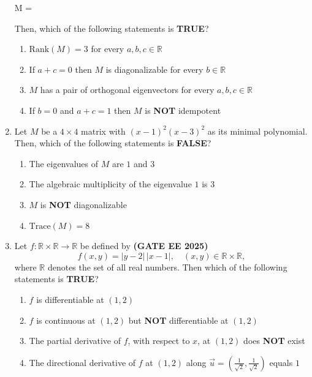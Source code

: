 \documentclass[journal,12pt,onecolumn]{IEEEtran}
\theoremstyle{remark}
\begin{document}
\begin{enumerate}
M = 


Then, which of the following statements is \textbf{TRUE}?
\begin{enumerate}
\item $\text{Rank}(M) = 3$ for every $a,b,c \in \mathbb{R}$
\item If $a+c=0$ then $M$ is diagonalizable for every $b \in \mathbb{R}$
\item $M$ has a pair of orthogonal eigenvectors for every $a,b,c \in \mathbb{R}$
\item If $b=0$ and $a+c=1$ then $M$ is \textbf{NOT} idempotent
\end{enumerate}


\item Let $M$ be a $4 \times 4$ matrix with $(x-1)^2(x-3)^2$ as its minimal polynomial. Then, which of the following statements is \textbf{FALSE}?
\begin{enumerate}
\item The eigenvalues of $M$ are $1$ and $3$
\item The algebraic multiplicity of the eigenvalue $1$ is $3$
\item $M$ is \textbf{NOT} diagonalizable
\item $\text{Trace}(M) = 8$
\end{enumerate}


\item Let $f : \mathbb{R} \times \mathbb{R} \to \mathbb{R}$ be defined by \hfill \textbf{(GATE EE 2025)}
\[
f(x,y) = |y - 2| \, |x - 1|, \quad (x,y) \in \mathbb{R} \times \mathbb{R},
\]
where $\mathbb{R}$ denotes the set of all real numbers. Then which of the following statements is \textbf{TRUE}?
\begin{enumerate}
\item $f$ is differentiable at $(1,2)$
\item $f$ is continuous at $(1,2)$ but \textbf{NOT} differentiable at $(1,2)$
\item The partial derivative of $f$, with respect to $x$, at $(1,2)$ does \textbf{NOT} exist
\item The directional derivative of $f$ at $(1,2)$ along $\vec{u} = \left(\tfrac{1}{\sqrt{2}}, \tfrac{1}{\sqrt{2}} \right)$ equals $1$
\end{enumerate}



\end{enumerate}
\end{document}
